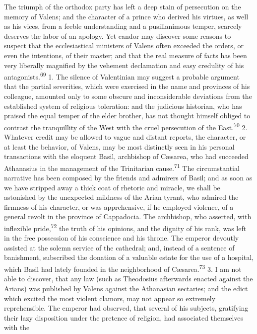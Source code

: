 The triumph of the orthodox party has left a deep stain of
persecution on the memory of Valens; and the character of a
prince who derived his virtues, as well as his vices, from a
feeble understanding and a pusillanimous temper, scarcely
deserves the labor of an apology. Yet candor may discover some
reasons to suspect that the ecclesiastical ministers of Valens
often exceeded the orders, or even the intentions, of their
master; and that the real measure of facts has been very
liberally magnified by the vehement declamation and easy
credulity of his antagonists.\textsuperscript{69} 1. The silence of Valentinian
may suggest a probable argument that the partial severities,
which were exercised in the name and provinces of his colleague,
amounted only to some obscure and inconsiderable deviations from
the established system of religious toleration: and the judicious
historian, who has praised the equal temper of the elder brother,
has not thought himself obliged to contrast the tranquillity of
the West with the cruel persecution of the East.\textsuperscript{70} 2. Whatever
credit may be allowed to vague and distant reports, the
character, or at least the behavior, of Valens, may be most
distinctly seen in his personal transactions with the eloquent
Basil, archbishop of Cæsarea, who had succeeded Athanasius in the
management of the Trinitarian cause.\textsuperscript{71} The circumstantial
narrative has been composed by the friends and admirers of Basil;
and as soon as we have stripped away a thick coat of rhetoric and
miracle, we shall be astonished by the unexpected mildness of the
Arian tyrant, who admired the firmness of his character, or was
apprehensive, if he employed violence, of a general revolt in the
province of Cappadocia. The archbishop, who asserted, with
inflexible pride,\textsuperscript{72} the truth of his opinions, and the dignity
of his rank, was left in the free possession of his conscience
and his throne. The emperor devoutly assisted at the solemn
service of the cathedral; and, instead of a sentence of
banishment, subscribed the donation of a valuable estate for the
use of a hospital, which Basil had lately founded in the
neighborhood of Cæsarea.\textsuperscript{73} 3. I am not able to discover, that
any law (such as Theodosius afterwards enacted against the
Arians) was published by Valens against the Athanasian sectaries;
and the edict which excited the most violent clamors, may not
appear so extremely reprehensible. The emperor had observed, that
several of his subjects, gratifying their lazy disposition under
the pretence of religion, had associated themselves with the
